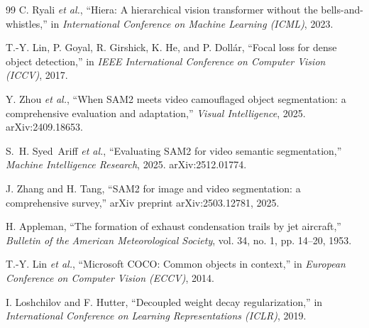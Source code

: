 \documentclass[1p,11pt]{elsarticle}
\begin{document}
\begin{thebibliography}{99}
C. Ryali \textit{et al.}, ``Hiera: A hierarchical vision transformer without the bells-and-whistles,'' in \textit{International Conference on Machine Learning (ICML)}, 2023.

T.-Y. Lin, P. Goyal, R. Girshick, K. He, and P. Doll\'{a}r, ``Focal loss for dense object detection,'' in \textit{IEEE International Conference on Computer Vision (ICCV)}, 2017.

Y. Zhou \textit{et al.}, ``When SAM2 meets video camouflaged object segmentation: a comprehensive evaluation and adaptation,'' \textit{Visual Intelligence}, 2025. arXiv:2409.18653.

S.~H. Syed~Ariff \textit{et al.}, ``Evaluating SAM2 for video semantic segmentation,'' \textit{Machine Intelligence Research}, 2025. arXiv:2512.01774.

J. Zhang and H. Tang, ``SAM2 for image and video segmentation: a comprehensive survey,'' arXiv preprint arXiv:2503.12781, 2025.

H. Appleman, ``The formation of exhaust condensation trails by jet aircraft,'' \textit{Bulletin of the American Meteorological Society}, vol. 34, no. 1, pp. 14--20, 1953.

T.-Y. Lin \textit{et al.}, ``Microsoft COCO: Common objects in context,'' in \textit{European Conference on Computer Vision (ECCV)}, 2014.

I. Loshchilov and F. Hutter, ``Decoupled weight decay regularization,'' in \textit{International Conference on Learning Representations (ICLR)}, 2019.

\end{thebibliography}
\end{document}
